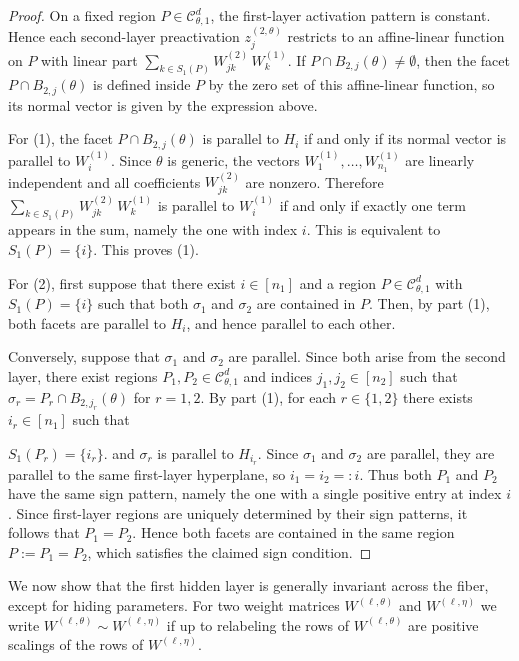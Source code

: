 \documentclass{article}
\theoremstyle{definition}
\newcommand{\weights}[1]{W^{(#1)}}
\newcommand{\complex}{\mathcal{C}}
\newcommand{\preactivation}[1]{z^{(#1)}}
\begin{document}
\begin{proof}
On a fixed region $P \in \complex_{\theta,1}^{d}$, the first-layer activation pattern is constant. Hence each second-layer preactivation $\preactivation{2,\theta}_j$ restricts to an affine-linear function on $P$ with linear part
$
\sum_{k \in S_1(P)}\weights{2}_{jk}\,\weights{1}_k.
$
If $P\cap B_{2,j}(\theta)\neq\emptyset$, then the facet $P\cap B_{2,j}(\theta)$ is defined inside $P$ by the zero set of this affine-linear function, so its normal vector is given by the expression above.

For (1), the facet $P \cap B_{2,j}(\theta)$ is parallel to $H_i$ if and only if its normal vector is parallel to $\weights{1}_i$. Since $\theta$ is generic, the vectors $\weights{1}_1,\dots,\weights{1}_{n_1}$ are linearly independent and all coefficients $\weights{2}_{jk}$ are nonzero. Therefore
$
\sum_{k \in S_1(P)}\weights{2}_{jk}\,\weights{1}_k
$
is parallel to $\weights{1}_i$ if and only if exactly one term appears in the sum, namely the one with index $i$. This is equivalent to
$S_1(P) =\{i\}$.
This proves (1).

For (2), first suppose that there exist $i\in[n_1]$ and a region $P\in\complex_{\theta,1}^{d}$ with
$S_1(P) =\{i\}$
such that both $\sigma_1$ and $\sigma_2$ are contained in $P$. Then, by part (1), both facets are parallel to $H_i$, and hence parallel to each other.

Conversely, suppose that $\sigma_1$ and $\sigma_2$ are parallel. Since both arise from the second layer, there exist regions $P_1,P_2\in\complex_{\theta,1}^{d}$ and indices $j_1,j_2\in[n_2]$ such that
$
\sigma_r = P_r \cap B_{2,j_r}(\theta)$ for $ r=1,2.
$
By part (1), for each $r\in\{1,2\}$ there exists $i_r\in[n_1]$ such that

$S_1(P_r) =\{i_r\}$.
and $\sigma_r$ is parallel to $H_{i_r}$. Since $\sigma_1$ and $\sigma_2$ are parallel, they are parallel to the same first-layer hyperplane, so $i_1=i_2=:i$. Thus both $P_1$ and $P_2$ have the same sign pattern, namely the one with a single positive entry at index $i$. Since first-layer regions are uniquely determined by their sign patterns, it follows that $P_1=P_2$. Hence both facets are contained in the same region $P:=P_1=P_2$, which satisfies the claimed sign condition.
\end{proof}





We now show that the first hidden layer is generally invariant across the fiber, except for hiding parameters. For two weight matrices $\weights{\ell,\theta}$ and $\weights{\ell,\eta}$ we write $\weights{\ell,\theta} 
\sim \weights{\ell,\eta}$ if up to relabeling the rows of $\weights{\ell,\theta} $ are positive scalings of the rows of $
\weights{\ell,\eta}$.
\end{document}
